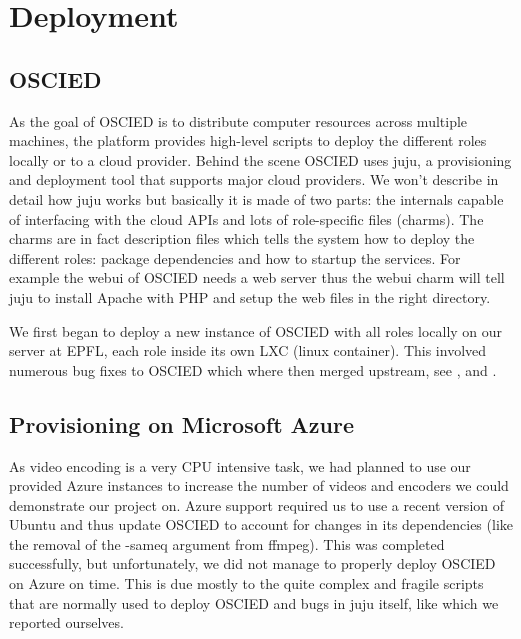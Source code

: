 \documentclass[a4paper,12pt]{article}
\begin{document}

\section{Deployment}
\subsection{OSCIED}
As the goal of OSCIED is to distribute computer resources across multiple
machines, the platform provides high-level scripts to deploy the different roles
locally or to a cloud provider.  Behind the scene OSCIED uses juju, a
provisioning and deployment tool that supports major cloud providers.  We won't
describe in detail how juju works but basically it is made of two parts: the
internals capable of interfacing with the cloud APIs and lots of
role-specific files (charms).  The charms are in fact description files which
tells the system how to deploy the different roles: package dependencies and how
to startup the services.  For example the webui of OSCIED needs a web server
thus the webui charm will tell juju to install Apache with PHP and setup the web
files in the right directory.

We first began to deploy a new instance of OSCIED with all roles locally on our
server at EPFL, each role inside its own LXC (linux container).  This involved
numerous bug fixes to OSCIED which where then merged upstream, see
\cite{ebu_merge1},
\cite{oscied_merge1}
and
\cite{pytoolbox_merge1}.

\subsection{Provisioning on Microsoft Azure}
As video encoding is a very CPU intensive task, we had planned to use our
provided Azure instances to increase the number of videos and encoders we could
demonstrate our project on. Azure support required us to use a recent version of
Ubuntu and thus update OSCIED to account for changes in its dependencies (like
the removal of the -sameq argument from ffmpeg). This was completed
successfully, but unfortunately, we did not manage to properly deploy OSCIED on
Azure on time. This is due mostly to the quite complex and fragile scripts that
are normally used to deploy OSCIED and bugs in juju itself, like
\cite{juju_bug1} which we reported ourselves.
\end{document}
